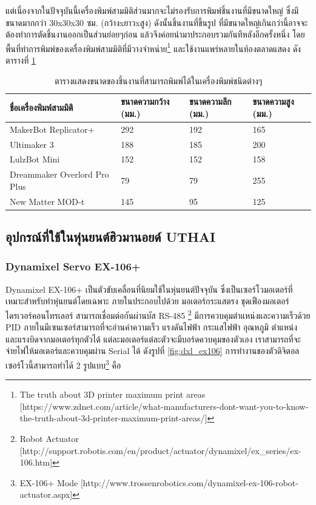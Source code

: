 แต่เนื่องจากในปัจจุบันนี้เครื่องพิมพ์สามมิติส่วนมากจะไม่รองรับการพิมพ์ชิ้นงานที่มีขนาดใหญ่ ซึ่งมีขนาดมากกว่า
30x30x30 ซม. (กว้างxยาวxสูง) ดังนั้นชิ้นงานที่ขึ้นรูป ที่มีขนาดใหญ่เกินกว่านี้อาจจะต้องทำการตัดชิ้นงานออกเป็นส่วนย่อยๆก่อน
แล้วจึงค่อยนำมาประกอบรวมกันทีหลังอีกครั้งหนึ่ง โดยพื้นที่ทำการพิมพ์ของเครื่องพิมพ์สามมิติที่มีวางจำหน่าย\footnote{The truth about 3D printer maximum print areas [https://www.zdnet.com/article/what-manufacturers-dont-want-you-to-know-the-truth-about-3d-printer-maximum-print-areas/]}
และใช้งานแพร่หลายในท้องตลาดแสดง ดังตารางที่ \ref{tab:3dprint_space} 
\begin{table}[!ht]
	\centering
	\begin{tabular}{| l | l | l | l |}
		\hline
		ชื่อเครื่องพิมพ์สามมิติ & ขนาดความกว้าง (มม.) & ขนาดความลึก (มม.) & ขนาดความสูง (มม.) \\
        \hline
        MakerBot Replicator+ & 292 & 192 & 165 \\
        Ultimaker 3 & 188 & 185 & 200 \\
        LulzBot Mini & 152 & 152 & 158 \\
        Dreammaker Overlord Pro Plus & 79 & 79 & 255 \\
        New Matter MOD-t & 145 & 95 & 125 \\
	    \hline
	\end{tabular}
	\caption{ตารางแสดงขนาดของชิ้นงานที่สามารถพิมพ์ได้ในเครื่องพิมพ์ชนิดต่างๆ}
	\label{tab:3dprint_space}
\end{table}



\clearpage
\subsection{อุปกรณ์ที่ใช้ในหุ่นยนต์ฮิวมานอยด์ UTHAI}

\subsubsection*{Dynamixel Servo EX-106+}
Dynamixel EX-106+ เป็นตัวขับเคลื่อนที่นิยมใช้ในหุ่นยนต์ปัจจุบัน ซึ่งเป็นเซอร์โวมอเตอร์ที่เหมาะสำหรับทำหุ่นยนต์โดยเฉพาะ
ภายในประกอบไปด้วย มอเตอร์กระแสตรง ชุดเฟืองมอเตอร์ ไดรเวอร์คอนโทรเลอร์ สามารถเชื่อมต่อกันผ่านบัส RS-485
\footnote{ Robot Actuator [http://support.robotis.com/en/product/actuator/dynamixel/ex\_series/ex-106.htm] }
มีการควบคุมตำแหน่งและความเร็วด้วย PID ภายในมีเซนเซอร์สามารถที่จะอ่านค่าความเร็ว
แรงดันไฟฟ้า กระแสไฟฟ้า อุณหภูมิ ตำแหน่ง และแรงบิดจากมอเตอร์ทุกตัวได้ แต่ละมอเตอร์แต่ละตัวจะมีบอร์ดควบคุมของตัวเอง
เราสามารถที่จะจ่ายไฟให้มอเตอร์และควบคุมผ่าน Serial ได้ ดังรูปที่ \ref{fig:dxl_ex106}
การทำงานของตัวดิจิตอลเซอร์โวนี้สามารถทำได้ 2 รูปแบบ\footnote{ EX-106+ Mode [http://www.trossenrobotics.com/dynamixel-ex-106-robot-actuator.aspx]}
คือ

